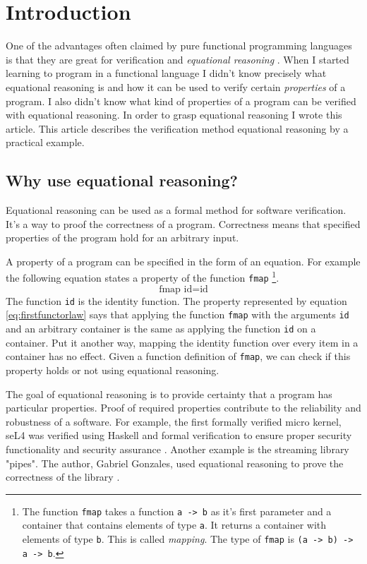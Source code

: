 \section{Introduction}
\label{sec:This}

One of the advantages often claimed by pure functional programming languages is that they are great for \gls{verification} and \emph{equational reasoning} \cite{Wadler87}.
When I started learning to program in a functional language I didn't know precisely what equational reasoning is and how it can be used to verify certain \emph{properties} of a program. I also didn't know what kind of properties of a program can be verified with equational reasoning. In order to grasp equational reasoning I wrote this article.
This article describes the verification method equational reasoning by a practical example. 

\subsection{Why use equational reasoning?}

Equational reasoning can be used as a formal method for software verification. It's a way to proof the correctness of a program. Correctness means that specified properties of the program hold for an arbitrary input. 

A property of a program can be specified in the form of an equation. For example the following equation states a property of the function \verb|fmap|  \footnote{The function \verb|fmap| takes a function \verb|a -> b| as it's first parameter and a container that contains elements of type \verb|a|. It returns a container with elements of type \verb|b|. This is called \emph{mapping}. The type of \verb|fmap| is \verb|(a -> b) -> a -> b|.}.
\begin{equation}
  \label{eq:firstfunctorlaw}
\text{fmap } \text{id}  =  \text{id}  
\end{equation}
 The function \verb|id| is the identity function. The property represented by equation \ref{eq:firstfunctorlaw} says that applying the function \verb|fmap| with the arguments \verb|id| and an arbitrary container is the same as applying the function \verb|id| on a container. Put it another way, mapping the identity function over every item in a container has no effect. Given a function definition of \verb|fmap|, we can check if this property holds or not using equational reasoning.

The goal of equational reasoning is to provide certainty that a program has particular properties. Proof of required properties contribute to the reliability and robustness of a software. 
For example, the first formally verified micro kernel, seL4 was verified using Haskell and formal verification to ensure proper security functionality and security assurance \cite{Klein09}.
Another example is the streaming library "pipes". The author, Gabriel Gonzales, used equational reasoning to prove the correctness of the library \cite{gonzales13}.

